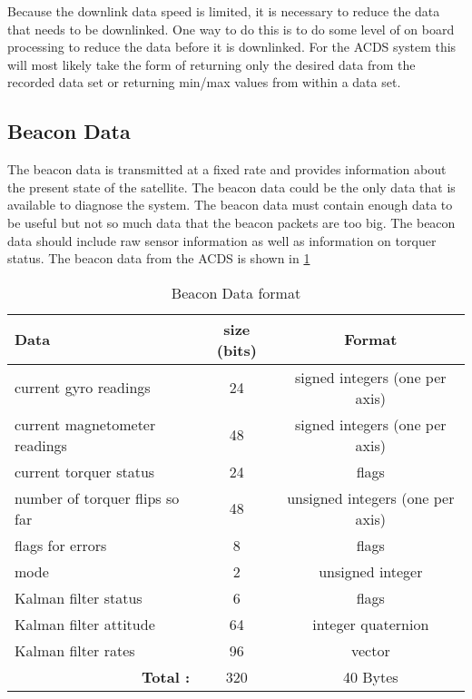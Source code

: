 Because the downlink data speed is limited, it is necessary to reduce the data that needs to be downlinked. One way to do this is to do some level of on board processing to reduce the data before it is downlinked. For the \ac{ACDS} system this will most likely take the form of returning only the desired data from the recorded data set or returning min/max values from within a data set. 


\subsection{Beacon Data}

The beacon data is transmitted at a fixed rate and provides information about the present state of the satellite. The beacon data could be the only data that is available to diagnose the system. The beacon data must contain enough data to be useful but not so much data that the beacon packets are too big. The beacon data should include raw sensor information as well as information on torquer status. The beacon data from the \ac{ACDS} is shown in \cref{tab:beacondat}

\begin{table}[H]
    \centering
    \caption{Beacon Data format}
    \label{tab:beacondat}
    \begin{tabular}{|l|c|c|}
        \hline
        Data&size (bits)&Format\\
        \hline
        current gyro readings&24&signed integers (one per axis)\\
        \hline
        current magnetometer readings&48&signed integers (one per axis)\\
        \hline
        current torquer status&24&flags\\
        \hline
        number of torquer flips so far & 48 & unsigned integers (one per axis)\\
        \hline
        flags for errors& 8 & flags\\
        \hline
        mode&2&unsigned integer\\
        \hline
        Kalman filter status&6&flags\\
        \hline
        Kalman filter attitude&64&integer quaternion\\
        \hline
        Kalman filter rates&96&vector\\
        \hline
        \multicolumn{1}{|r|}{\bfseries Total :}&320&40 Bytes\\
        \hline
    \end{tabular}
\end{table}

